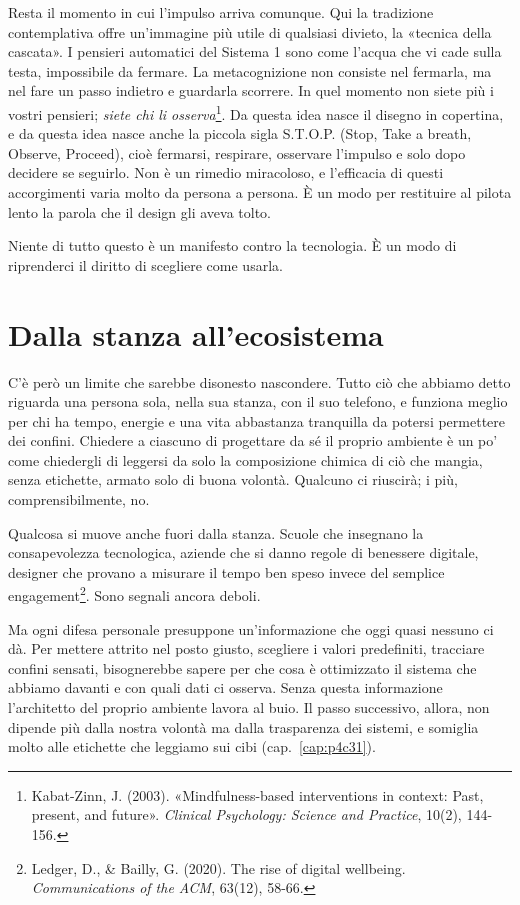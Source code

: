 
Resta il momento in cui l'impulso arriva comunque. Qui la tradizione contemplativa offre un'immagine più utile di qualsiasi divieto, la «tecnica della cascata». I pensieri automatici del Sistema 1 sono come l'acqua che vi cade sulla testa, impossibile da fermare. La metacognizione non consiste nel fermarla, ma nel fare un passo indietro e guardarla scorrere. In quel momento non siete più i vostri pensieri; \textit{siete chi li osserva}\footnote{Kabat-Zinn, J. (2003). «Mindfulness-based interventions in context: Past, present, and future». \textit{Clinical Psychology: Science and Practice}, 10(2), 144-156.}. Da questa idea nasce il disegno in copertina, e da questa idea nasce anche la piccola sigla S.T.O.P. (Stop, Take a breath, Observe, Proceed), cioè fermarsi, respirare, osservare l'impulso e solo dopo decidere se seguirlo. Non è un rimedio miracoloso, e l'efficacia di questi accorgimenti varia molto da persona a persona. È un modo per restituire al pilota lento la parola che il design gli aveva tolto.

Niente di tutto questo è un manifesto contro la tecnologia. È un modo di riprenderci il diritto di scegliere come usarla.

\section{Dalla stanza all'ecosistema}

C'è però un limite che sarebbe disonesto nascondere. Tutto ciò che abbiamo detto riguarda una persona sola, nella sua stanza, con il suo telefono, e funziona meglio per chi ha tempo, energie e una vita abbastanza tranquilla da potersi permettere dei confini. Chiedere a ciascuno di progettare da sé il proprio ambiente è un po' come chiedergli di leggersi da solo la composizione chimica di ciò che mangia, senza etichette, armato solo di buona volontà. Qualcuno ci riuscirà; i più, comprensibilmente, no.

Qualcosa si muove anche fuori dalla stanza. Scuole che insegnano la consapevolezza tecnologica, aziende che si danno regole di benessere digitale, designer che provano a misurare il tempo ben speso invece del semplice engagement\footnote{Ledger, D., \& Bailly, G. (2020). The rise of digital wellbeing. \textit{Communications of the ACM}, 63(12), 58-66.}. Sono segnali ancora deboli.

Ma ogni difesa personale presuppone un'informazione che oggi quasi nessuno ci dà. Per mettere attrito nel posto giusto, scegliere i valori predefiniti, tracciare confini sensati, bisognerebbe sapere per che cosa è ottimizzato il sistema che abbiamo davanti e con quali dati ci osserva. Senza questa informazione l'architetto del proprio ambiente lavora al buio. Il passo successivo, allora, non dipende più dalla nostra volontà ma dalla trasparenza dei sistemi, e somiglia molto alle etichette che leggiamo sui cibi (cap.~\ref{cap:p4c31}).
